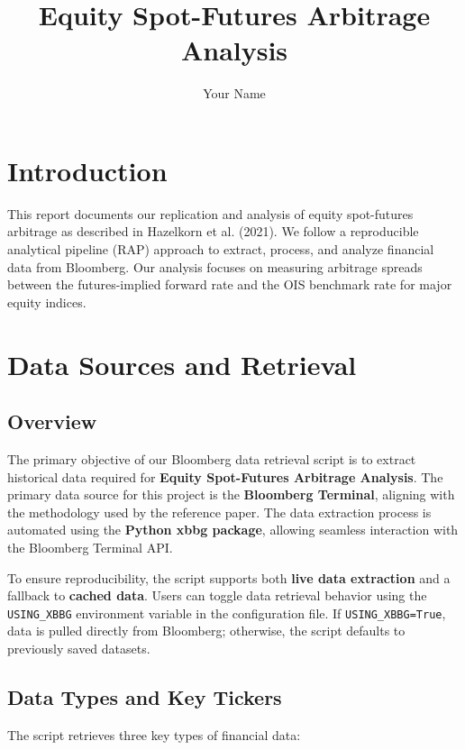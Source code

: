 \documentclass{article}
\title{Equity Spot-Futures Arbitrage Analysis}
\author{Your Name}
\begin{document}
\maketitle

\section{Introduction}
This report documents our replication and analysis of equity spot-futures arbitrage as described in Hazelkorn et al. (2021). We follow a reproducible analytical pipeline (RAP) approach to extract, process, and analyze financial data from Bloomberg. Our analysis focuses on measuring arbitrage spreads between the futures-implied forward rate and the OIS benchmark rate for major equity indices.

\section{Data Sources and Retrieval}
\subsection{Overview}
The primary objective of our Bloomberg data retrieval script is to extract historical data required for \textbf{Equity Spot-Futures Arbitrage Analysis}. The primary data source for this project is the \textbf{Bloomberg Terminal}, aligning with the methodology used by the reference paper. The data extraction process is automated using the \textbf{Python xbbg package}, allowing seamless interaction with the Bloomberg Terminal API.

To ensure reproducibility, the script supports both \textbf{live data extraction} and a fallback to \textbf{cached data}. Users can toggle data retrieval behavior using the \texttt{USING\_XBBG} environment variable in the configuration file. If \texttt{USING\_XBBG=True}, data is pulled directly from Bloomberg; otherwise, the script defaults to previously saved datasets.

\subsection{Data Types and Key Tickers}
The script retrieves three key types of financial data:
\end{document}
